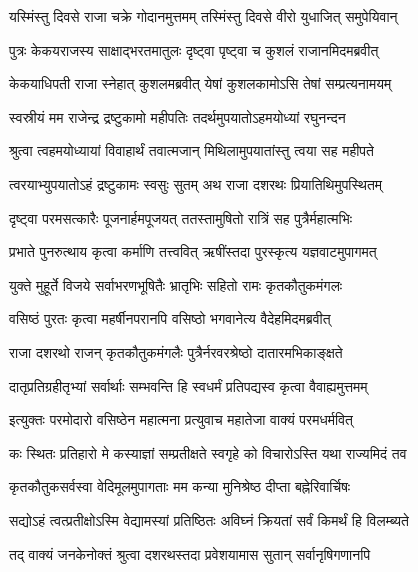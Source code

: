 
\twolineshloka
{यस्मिंस्तु दिवसे राजा चक्रे गोदानमुत्तमम्}
{तस्मिंस्तु दिवसे वीरो युधाजित् समुपेयिवान्} %

\twolineshloka
{पुत्रः केकयराजस्य साक्षाद्भरतमातुलः}
{दृष्ट्वा पृष्ट्वा च कुशलं राजानमिदमब्रवीत्} %

\twolineshloka
{केकयाधिपती राजा स्नेहात् कुशलमब्रवीत्}
{येषां कुशलकामोऽसि तेषां सम्प्रत्यनामयम्} %

\twolineshloka
{स्वस्रीयं मम राजेन्द्र द्रष्टुकामो महीपतिः}
{तदर्थमुपयातोऽहमयोध्यां रघुनन्दन} %

\twolineshloka
{श्रुत्वा त्वहमयोध्यायां विवाहार्थं तवात्मजान्}
{मिथिलामुपयातांस्तु त्वया सह महीपते} %

\twolineshloka
{त्वरयाभ्युपयातोऽहं द्रष्टुकामः स्वसुः सुतम्}
{अथ राजा दशरथः प्रियातिथिमुपस्थितम्} %

\twolineshloka
{दृष्ट्वा परमसत्कारैः पूजनार्हमपूजयत्}
{ततस्तामुषितो रात्रिं सह पुत्रैर्महात्मभिः} %

\twolineshloka
{प्रभाते पुनरुत्थाय कृत्वा कर्माणि तत्त्ववित्}
{ऋषींस्तदा पुरस्कृत्य यज्ञवाटमुपागमत्} %

\twolineshloka
{युक्ते मुहूर्ते विजये सर्वाभरणभूषितैः}
{भ्रातृभिः सहितो रामः कृतकौतुकमंगलः} %

\twolineshloka
{वसिष्ठं पुरतः कृत्वा महर्षीनपरानपि}
{वसिष्ठो भगवानेत्य वैदेहमिदमब्रवीत्} %

\twolineshloka
{राजा दशरथो राजन् कृतकौतुकमंगलैः}
{पुत्रैर्नरवरश्रेष्ठो दातारमभिकाङ्क्षते} %

\twolineshloka
{दातृप्रतिग्रहीतृभ्यां सर्वार्थाः सम्भवन्ति हि}
{स्वधर्मं प्रतिपद्यस्व कृत्वा वैवाह्यमुत्तमम्} %

\twolineshloka
{इत्युक्तः परमोदारो वसिष्ठेन महात्मना}
{प्रत्युवाच महातेजा वाक्यं परमधर्मवित्} %

\twolineshloka
{कः स्थितः प्रतिहारो मे कस्याज्ञां सम्प्रतीक्षते}
{स्वगृहे को विचारोऽस्ति यथा राज्यमिदं तव} %

\twolineshloka
{कृतकौतुकसर्वस्वा वेदिमूलमुपागताः}
{मम कन्या मुनिश्रेष्ठ दीप्ता बह्नेरिवार्चिषः} %

\twolineshloka
{सद्योऽहं त्वत्प्रतीक्षोऽस्मि वेद्यामस्यां प्रतिष्ठितः}
{अविघ्नं क्रियतां सर्वं किमर्थं हि विलम्ब्यते} %

\twolineshloka
{तद् वाक्यं जनकेनोक्तं श्रुत्वा दशरथस्तदा}
{प्रवेशयामास सुतान् सर्वानृषिगणानपि} %

